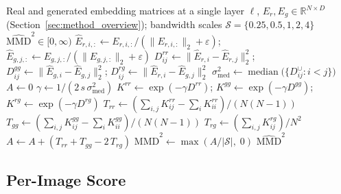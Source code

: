 \documentclass[lettersize,journal]{IEEEtran}
\begin{document}
\begin{algorithm}[t]
\caption{Unbiased multi-bandwidth RBF MMD$^2$}
\label{alg:mmd}
\begin{algorithmic}[1]
\Require Real and generated embedding matrices at a single layer $\ell$,
         $E_r, E_g \in \mathbb{R}^{N \times D}$ (Section~\ref{sec:method_overview});
         bandwidth scales $\mathcal{S} = \{0.25, 0.5, 1, 2, 4\}$
\Ensure  $\widehat{\mathrm{MMD}}^2 \in [0, \infty)$
\State $\hat{E}_{r,i,:} \leftarrow E_{r,i,:} / (\lVert E_{r,i,:} \rVert_2 + \varepsilon)$;\;
       $\hat{E}_{g,j,:} \leftarrow E_{g,j,:} / (\lVert E_{g,j,:} \rVert_2 + \varepsilon)$
\State $D^{rr}_{ij} \leftarrow \lVert \hat{E}_{r,i} - \hat{E}_{r,j} \rVert_2^2$;\;
       $D^{gg}_{ij} \leftarrow \lVert \hat{E}_{g,i} - \hat{E}_{g,j} \rVert_2^2$;\;
       $D^{rg}_{ij} \leftarrow \lVert \hat{E}_{r,i} - \hat{E}_{g,j} \rVert_2^2$
\State $\sigma_\mathrm{med}^2 \leftarrow
       \operatorname{median}\bigl(\{D^{\cup}_{ij} : i < j\}\bigr)$
\State $A \leftarrow 0$
  \State $\gamma \leftarrow 1 / (2\, s\, \sigma_\mathrm{med}^2)$
  \State $K^{rr} \leftarrow \exp(-\gamma D^{rr})$;\;
         $K^{gg} \leftarrow \exp(-\gamma D^{gg})$;\;
         $K^{rg} \leftarrow \exp(-\gamma D^{rg})$
  \State $T_{rr} \leftarrow
         (\sum_{i,j} K^{rr}_{ij} - \sum_i K^{rr}_{ii}) / (N(N-1))$
  \State $T_{gg} \leftarrow
         (\sum_{i,j} K^{gg}_{ij} - \sum_i K^{gg}_{ii}) / (N(N-1))$
  \State $T_{rg} \leftarrow (\sum_{i,j} K^{rg}_{ij}) / N^2$
  \State $A \leftarrow A + (T_{rr} + T_{gg} - 2\,T_{rg})$
\EndFor
\State $\widehat{\mathrm{MMD}}^2 \leftarrow
       \max(A / |\mathcal{S}|,\; 0)$
\State \Return $\widehat{\mathrm{MMD}}^2$
\end{algorithmic}
\end{algorithm}

\subsection{Per-Image Score}
\label{sec:method_perim}
\end{document}
